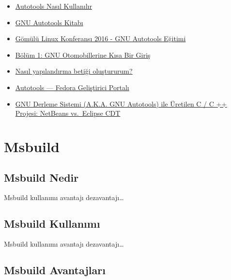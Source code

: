 \documentclass[
]{book}
\providecommand{\tightlist}{%
  \setlength{\itemsep}{0pt}\setlength{\parskip}{0pt}}
\begin{document}
\begin{itemize}
\tightlist
\item
  \href{https://eklitzke.org/how-to-autotools}{Autotools Nasıl Kullanılır}
\item
  \href{https://www.star.bnl.gov/~liuzx/autobook.html}{GNU Autotools Kitabı}
\item
  \href{https://elinux.org/images/4/43/Petazzoni.pdf}{Gömülü Linux Konferansı 2016 - GNU Autotools Eğitimi}
\item
  \href{http://freesoftwaremagazine.com/articles/brief_introduction_to_gnu_autotools/}{Bölüm 1: GNU Otomobillerine Kısa Bir Giriş}
\item
  \href{https://stackoverflow.com/questions/10999549/how-do-i-create-a-configure-script}{Nasıl yapılandırma betiği oluştururum?}
\item
  \href{https://developer.fedoraproject.org/tech/languages/c/autotools.html}{Autotools --- Fedora Geliştirici Portalı}
\item
  \href{http://thegreyblog.blogspot.com/2013/09/cc-project-built-with-gnu-build-system.html}{GNU Derleme Sistemi (A.K.A. GNU Autotools) ile Üretilen C / C ++ Projesi: NetBeans vs.~Eclipse CDT}
\end{itemize}

\hypertarget{msbuild}{%
\chapter{Msbuild}\label{msbuild}}

\hypertarget{msbuild-nedir}{%
\section{Msbuild Nedir}\label{msbuild-nedir}}

Msbuild kullanımı avantajı dezavantajı\ldots{}

\hypertarget{msbuild-kullanux131mux131}{%
\section{Msbuild Kullanımı}\label{msbuild-kullanux131mux131}}

Msbuild kullanımı avantajı dezavantajı\ldots{}

\hypertarget{msbuild-avantajlarux131}{%
\section{Msbuild Avantajları}\label{msbuild-avantajlarux131}}
\end{document}
